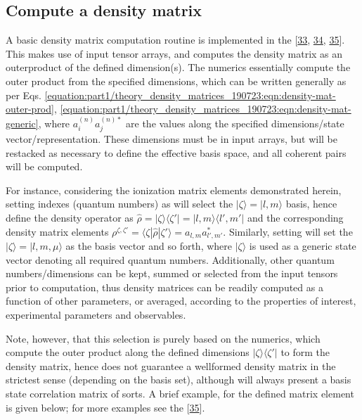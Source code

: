 \documentclass[letterpaper,table,10pt,english]{jupyterBook}
\begin{document}
\subsection{Compute a density matrix}
\label{\detokenize{part1/theory_density_matrices_190723:compute-a-density-matrix}}
\sphinxAtStartPar
A basic density matrix computation routine is implemented in the  {[}\hyperlink{cite.backmatter/bibliography:id665}{33}, \hyperlink{cite.backmatter/bibliography:id607}{34}, \hyperlink{cite.backmatter/bibliography:id605}{35}{]}. This makes use of input tensor arrays, and computes the density matrix as an outer\sphinxhyphen{}product of the defined dimension(s). The numerics essentially compute the outer product from the specified dimensions, which can be written generally as per Eqs. \eqref{equation:part1/theory_density_matrices_190723:eqn:density-mat-outer-prod}, \eqref{equation:part1/theory_density_matrices_190723:eqn:density-mat-generic}, where \(a_{i}^{(n)}a_{j}^{(n)*}\) are the values along the specified dimensions/state vector/representation. These dimensions must be in input arrays, but will be restacked as necessary to define the effective basis space, and all coherent pairs will be computed.

\sphinxAtStartPar
For instance, considering the ionization matrix elements demonstrated herein, setting indexes (quantum numbers) as \sphinxcode{\sphinxupquote{{[}l,m{]}}} will select the \(|\zeta\rangle = |l,m\rangle\) basis, hence define the density operator as \(\hat{\rho} = |\zeta\rangle \langle\zeta'| = |l,m\rangle\langle l',m'|\) and the corresponding density matrix elements \(\rho^{\zeta,\zeta'}=\langle\zeta|\hat{\rho}|\zeta'\rangle=a_{l,m}a_{l',m'}^{*}\). Similarly, setting \sphinxcode{\sphinxupquote{{[}'l','m','mu'{]}}} will set the \(|\zeta\rangle = |l,m,\mu\rangle\) as the basis vector and so forth, where \(|\zeta\rangle\) is used as a generic state vector denoting all required quantum numbers. Additionally, other quantum numbers/dimensions can be kept, summed or selected from the input tensors prior to computation, thus density matrices can be readily computed as a function of other parameters, or averaged, according to the properties of interest, experimental parameters and observables.

\sphinxAtStartPar
Note, however, that this selection is purely based on the numerics, which compute the outer product along the defined dimensions \(|\zeta\rangle\langle\zeta'|\) to form the density matrix, hence does not guarantee a well\sphinxhyphen{}formed density matrix in the strictest sense (depending on the basis set), although will always present a basis state correlation matrix of sorts. A brief example, for the  defined matrix element is given below; for more examples see the  {[}\hyperlink{cite.backmatter/bibliography:id605}{35}{]}.
\end{document}
